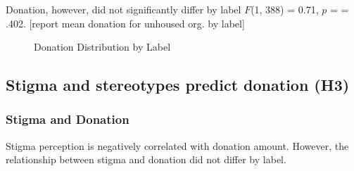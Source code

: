 \documentclass[
  man,
  floatsintext,
  longtable,
  nolmodern,
  notxfonts,
  notimes,
  colorlinks=true,linkcolor=blue,citecolor=blue,urlcolor=blue]{apa7}
\begin{document}
Donation, however, did not significantly differ by label \(F\)(1, 388) =
0.71, \(p\) = = .402. {[}report mean donation for unhoused org. by
label{]}

\begin{figure}

\caption{\label{fig-donate-all-by-label}Donation Distribution by Label}


\end{figure}%

\subsection{Stigma and stereotypes predict donation
(H3)}\label{stigma-and-stereotypes-predict-donation-h3}

\subsubsection{Stigma and Donation}\label{stigma-and-donation}

Stigma perception is negatively correlated with donation amount.
However, the relationship between stigma and donation did not differ by
label.
\end{document}
